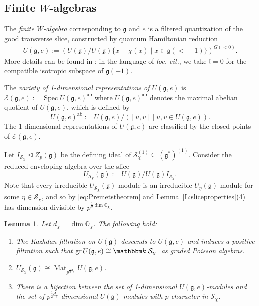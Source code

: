 \documentclass[twoside,12pt,reqno]{amsart}
\newtheorem{Lemma}[Theorem]{Lemma}
\theoremstyle{remark}
\numberwithin{equation}{section}
\def\k{{\mathbbm k}}
\def\ab{{\operatorname{ab}}}
\def\gr{\operatorname{gr}}
\def\Mat{\operatorname{Mat}}
\def\Spec{\operatorname{Spec}}
\def\O{{\mathbb O}}
\def\g{{\mathfrak g}}
\def\l{\mathfrak{l}}
\def\E{\mathcal{E}}
\renewcommand{\S}{\mathcal{S}}
\begin{document}
\subsection{Finite $W$-algebras}\label{ss:finWalg}

The {\em finite $W$-algebra} corresponding to $\g$ and $e$ is a filtered quantization of the good transverse slice, constructed by quantum Hamiltonian reduction
\begin{eqnarray}
U(\g,e) := (U(\g) / U(\g) \{x-\chi(x) \mid x\in \g(<\! -1)\})^{G(<0)}.    
\end{eqnarray} More details can be found in \cite[]{GTmodular}; in the language of {\em loc. cit.}, we take $\l=0$ for the compatible isotropic subspace of $\g(-1)$.

The {\it variety of 1-dimensional representations of $U(\g,e)$} is $\E(\g,e) := \Spec U(\g,e)^\ab$ where $U(\g,e)^\ab$ denotes the maximal abelian quotient of $U(\g,e)$, which is defined by $$U(\g,e)^\ab := U(\g,e)/([u,v] \mid u,v \in U(\g,e)).$$ The 1-dimensional representations of $U(\g,e)$ are classified by the closed points of $\E(\g,e)$.

Let $I_{\S_\chi} \unlhd Z_p(\g)$ be the defining ideal of $\S_\chi^{(1)} \subseteq (\g^*)^{(1)}$. Consider the reduced enveloping algebra over the slice
$$U_{\S_\chi}(\g) := U(\g) / U(\g) I_{\S_\chi}.$$ Note that every irreducible $U_{\S_\chi}(\g)$-module is an irreducible $U_\eta(\g)$-module for some $\eta\in\S_\chi$, and so by \eqref{eq:Premetstheorem} and Lemma~\ref{L:sliceproperties}(4) has dimension divisible by $p^{\frac{1}{2}\dim\O_\chi}$.

\begin{Lemma} \cite[\textsection{}, 9]{GTmodular}
\label{L:Walgebraproperties}
Let $d_\chi=\dim\O_\chi$. The following hold:
\begin{enumerate}
\setlength{\itemsep}{4pt}
\item The Kazhdan filtration on $U(\g)$ descends to $U(\g,e)$ and induces a positive filtration such that $\gr U(\g,e) \cong \k[\S_\chi]$ as graded Poisson algebras.
\item $U_{\S_\chi}(\g) \cong \Mat_{p^{\frac{1}{2}d_\chi}} U(\g,e)$.
\item There is a bijection between the set of 1-dimensional $U(\g,e)$-modules and the set of $p^{\frac{1}{2}d_\chi}$-dimensional $U(\g)$-modules with $p$-character in $\S_\chi$.
\end{enumerate}
\end{Lemma}
\end{document}

